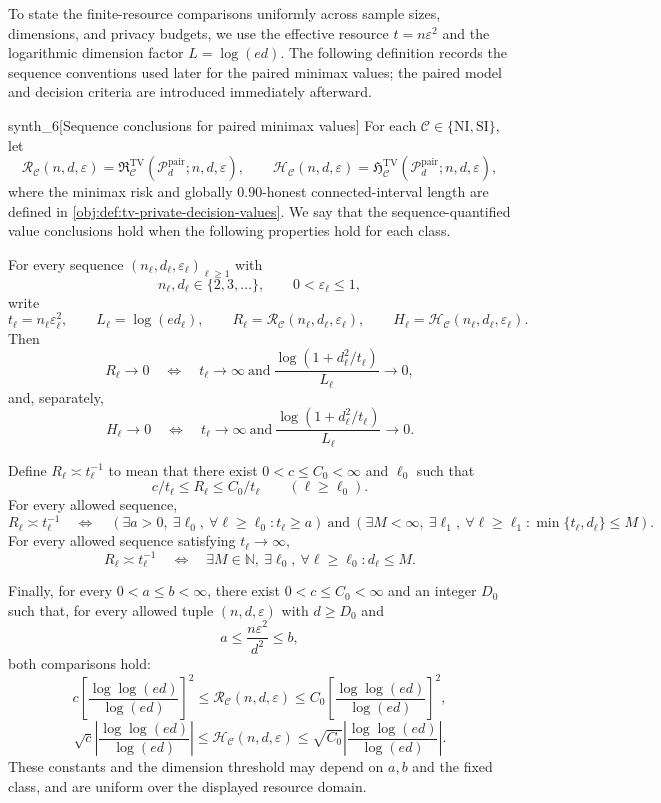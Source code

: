 To state the finite-resource comparisons uniformly across sample sizes, dimensions, and privacy budgets, we use the effective resource \(t=n\varepsilon^2\) and the logarithmic dimension factor \(L=\log(ed)\). The following definition records the sequence conventions used later for the paired minimax values; the paired model and decision criteria are introduced immediately afterward.

\begin{definitionv}{synth_6}[Sequence conclusions for paired minimax values]
For each \(\mathcal C\in\{\mathrm{NI},\mathrm{SI}\}\), let
\[
\mathcal R_{\mathcal C}(n,d,\varepsilon)
=\mathfrak R^{\mathrm{TV}}_{\mathcal C}
(\mathcal P_d^{\mathrm{pair}};n,d,\varepsilon),
\qquad
\mathcal H_{\mathcal C}(n,d,\varepsilon)
=\mathfrak H^{\mathrm{TV}}_{\mathcal C}
(\mathcal P_d^{\mathrm{pair}};n,d,\varepsilon),
\]
where the minimax risk and globally \(0.90\)-honest connected-interval length are defined in \cref{obj:def:tv-private-decision-values}. We say that the sequence-quantified value conclusions hold when the following properties hold for each class.

For every sequence \((n_\ell,d_\ell,\varepsilon_\ell)_{\ell\ge1}\) with
\[
n_\ell,d_\ell\in\{2,3,\ldots\},
\qquad 0<\varepsilon_\ell\le1,
\]
write
\[
t_\ell=n_\ell\varepsilon_\ell^2,\qquad
L_\ell=\log(ed_\ell),\qquad
R_\ell=\mathcal R_{\mathcal C}(n_\ell,d_\ell,\varepsilon_\ell),
\qquad
H_\ell=\mathcal H_{\mathcal C}(n_\ell,d_\ell,\varepsilon_\ell).
\]
Then
\[
R_\ell\longrightarrow0
\quad\Longleftrightarrow\quad
t_\ell\longrightarrow\infty
\ \text{and}\
\frac{\log(1+d_\ell^2/t_\ell)}{L_\ell}\longrightarrow0,
\]
and, separately,
\[
H_\ell\longrightarrow0
\quad\Longleftrightarrow\quad
t_\ell\longrightarrow\infty
\ \text{and}\
\frac{\log(1+d_\ell^2/t_\ell)}{L_\ell}\longrightarrow0.
\]

Define \(R_\ell\asymp t_\ell^{-1}\) to mean that there exist \(0<c\le C_0<\infty\) and \(\ell_0\) such that
\[
c/t_\ell\le R_\ell\le C_0/t_\ell
\qquad(\ell\ge\ell_0).
\]
For every allowed sequence,
\[
R_\ell\asymp t_\ell^{-1}
\quad\Longleftrightarrow\quad
\left(\exists a>0,\ \exists\ell_0,\ \forall\ell\ge\ell_0:
t_\ell\ge a\right)
\ \text{and}\
\left(\exists M<\infty,\ \exists\ell_1,\ \forall\ell\ge\ell_1:
\min\{t_\ell,d_\ell\}\le M\right).
\]
For every allowed sequence satisfying \(t_\ell\to\infty\),
\[
R_\ell\asymp t_\ell^{-1}
\quad\Longleftrightarrow\quad
\exists M\in\mathbb N,\ \exists\ell_0,\ \forall\ell\ge\ell_0:
d_\ell\le M.
\]

Finally, for every \(0<a\le b<\infty\), there exist \(0<c\le C_0<\infty\) and an integer \(D_0\) such that, for every allowed tuple \((n,d,\varepsilon)\) with \(d\ge D_0\) and
\[
a\le\frac{n\varepsilon^2}{d^2}\le b,
\]
both comparisons hold:
\[
c\left[\frac{\log\log(ed)}{\log(ed)}\right]^2
\le\mathcal R_{\mathcal C}(n,d,\varepsilon)
\le C_0\left[\frac{\log\log(ed)}{\log(ed)}\right]^2,
\]
\[
\sqrt c\left|\frac{\log\log(ed)}{\log(ed)}\right|
\le\mathcal H_{\mathcal C}(n,d,\varepsilon)
\le\sqrt{C_0}\left|\frac{\log\log(ed)}{\log(ed)}\right|.
\]
These constants and the dimension threshold may depend on \(a,b\) and the fixed class, and are uniform over the displayed resource domain.
\end{definitionv}

